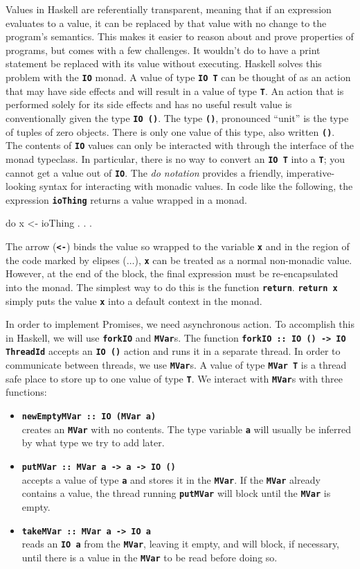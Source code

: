 \documentclass[12pt, english, letterpaper]{kuthesis}
\newcommand{\lit}[1]{\textbf{\texttt{#1}}}
\begin{document}
Values in Haskell are referentially transparent, meaning that if an expression evaluates to a value, it can be replaced by that value with no change to the program's semantics.  This makes it easier to reason about and prove properties of programs, but comes with a few challenges.  It wouldn't do to have a print statement be replaced with its value without executing.  Haskell solves this problem with the \lit{IO} monad.  A value of type \lit{IO T} can be thought of as an action that may have side effects and will result in a value of type \lit T.  An action that is performed solely for its side effects and has no useful result value is conventionally given the type \lit{IO ()}.  The type \lit{()}, pronounced ``unit'' is the type of tuples of zero objects.  There is only one value of this type, also written \lit{()}.  The contents of \lit{IO} values can only be interacted with through the interface of the monad typeclass.  In particular, there is no way to convert an \lit{IO T} into a \lit{T}; you cannot get a value out of \lit{IO}.  The \emph{do notation} provides a friendly, imperative-looking syntax for interacting with monadic values.  In code like the following, the expression \lit{ioThing} returns a value wrapped in a monad.
\begin{code}
 do
  x <- ioThing
  . . .
\end{code}
The arrow (\lit{<-}) binds the value so wrapped to the variable \lit x and in the region of the code marked by elipses (\lit{\(\dots\)}), \lit x can be treated as a normal non-monadic value.  However, at the end of the block, the final expression must be re-encapsulated into the monad.  The simplest way to do this is the function \lit{return}.  \lit{return x} simply puts the value \lit x into a default context in the monad.

In order to implement \textsf{Promises}, we need asynchronous action.  To accomplish this in Haskell, we will use \lit{forkIO} and \lit{MVar}s.  The function \lit{forkIO ::\ IO () -> IO ThreadId} accepts an \lit{IO ()} action and runs it in a separate thread.  In order to communicate between threads, we use \lit{MVar}s.  A value of type \lit{MVar T} is a thread safe place to store up to one value of type \lit T.  We interact with \lit{MVar}s with three functions:
\begin{itemize}
\item \lit{newEmptyMVar ::\ IO (MVar a)} \\
  creates an \lit{MVar} with no
  contents.  The type variable \lit a will usually be inferred by what
  type we try to add later.
\item \lit{putMVar ::\ MVar a -> a -> IO ()}\\
  accepts a value of type \lit a and stores it in the \lit{MVar}.  If
  the \lit{MVar} already contains a value, the thread running
  \lit{putMVar} will block until the \lit{MVar} is empty.
\item \lit{takeMVar ::\ MVar a -> IO a} \\
  reads an \lit{IO a} from the
  \lit{MVar}, leaving it empty, and will block, if necessary, until
  there is a value in the \lit{MVar} to be read before doing so.
\end{itemize}
\end{document}

